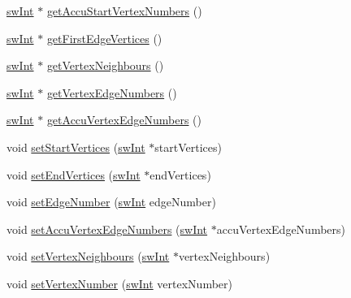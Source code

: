 \begin{DoxyCompactItemize}
\item 
\mbox{\hyperlink{include_2swMacro_8h_a113cf5f6b5377cdf3fac6aa4e443e9aa}{sw\+Int}} $\ast$ \mbox{\hyperlink{classUNAT_1_1Topology_a8512917aff938c0354abc0614e7a891a}{get\+Accu\+Start\+Vertex\+Numbers}} ()
\item 
\mbox{\hyperlink{include_2swMacro_8h_a113cf5f6b5377cdf3fac6aa4e443e9aa}{sw\+Int}} $\ast$ \mbox{\hyperlink{classUNAT_1_1Topology_a5ad1f147650d0c68c181230f88e3af18}{get\+First\+Edge\+Vertices}} ()
\item 
\mbox{\hyperlink{include_2swMacro_8h_a113cf5f6b5377cdf3fac6aa4e443e9aa}{sw\+Int}} $\ast$ \mbox{\hyperlink{classUNAT_1_1Topology_ae41f724783379d204fa64cba52b22395}{get\+Vertex\+Neighbours}} ()
\item 
\mbox{\hyperlink{include_2swMacro_8h_a113cf5f6b5377cdf3fac6aa4e443e9aa}{sw\+Int}} $\ast$ \mbox{\hyperlink{classUNAT_1_1Topology_a5b25e62c756c7c70658e92f8ef87d133}{get\+Vertex\+Edge\+Numbers}} ()
\item 
\mbox{\hyperlink{include_2swMacro_8h_a113cf5f6b5377cdf3fac6aa4e443e9aa}{sw\+Int}} $\ast$ \mbox{\hyperlink{classUNAT_1_1Topology_afdbb3f6bfe406e567fd1d88e5df6fb91}{get\+Accu\+Vertex\+Edge\+Numbers}} ()
\item 
void \mbox{\hyperlink{classUNAT_1_1Topology_a59740da48119b1fe9cbc08ec61edd1c2}{set\+Start\+Vertices}} (\mbox{\hyperlink{include_2swMacro_8h_a113cf5f6b5377cdf3fac6aa4e443e9aa}{sw\+Int}} $\ast$start\+Vertices)
\item 
void \mbox{\hyperlink{classUNAT_1_1Topology_a238cee750b0467fe8d479b88f4cd2399}{set\+End\+Vertices}} (\mbox{\hyperlink{include_2swMacro_8h_a113cf5f6b5377cdf3fac6aa4e443e9aa}{sw\+Int}} $\ast$end\+Vertices)
\item 
void \mbox{\hyperlink{classUNAT_1_1Topology_aaf9838827f3d81110b6911a23fc28864}{set\+Edge\+Number}} (\mbox{\hyperlink{include_2swMacro_8h_a113cf5f6b5377cdf3fac6aa4e443e9aa}{sw\+Int}} edge\+Number)
\item 
void \mbox{\hyperlink{classUNAT_1_1Topology_a06ea506a220c6eb45a6beb4106aa0dbc}{set\+Accu\+Vertex\+Edge\+Numbers}} (\mbox{\hyperlink{include_2swMacro_8h_a113cf5f6b5377cdf3fac6aa4e443e9aa}{sw\+Int}} $\ast$accu\+Vertex\+Edge\+Numbers)
\item 
void \mbox{\hyperlink{classUNAT_1_1Topology_aa82494c4b097ebb30f323947c9f3161e}{set\+Vertex\+Neighbours}} (\mbox{\hyperlink{include_2swMacro_8h_a113cf5f6b5377cdf3fac6aa4e443e9aa}{sw\+Int}} $\ast$vertex\+Neighbours)
\item 
void \mbox{\hyperlink{classUNAT_1_1Topology_aeddafa74ad2dc0769cf5e0a3384a20ce}{set\+Vertex\+Number}} (\mbox{\hyperlink{include_2swMacro_8h_a113cf5f6b5377cdf3fac6aa4e443e9aa}{sw\+Int}} vertex\+Number)

\end{DoxyCompactItemize}

